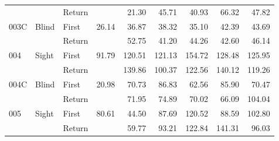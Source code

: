 \begin{table}[!htb]
\begin{tabular}{lllrrrrrr}
    &       & Return &          &   21.30 &   45.71 &                                                 40.93 &                                                  66.32 &   47.82 \\
003C & Blind & First &    26.14 &   36.87 &   38.32 &                                                 35.10 &                                                  42.39 &   43.69 \\
    &       & Return &          &   52.75 &   41.20 &                                                 44.26 &                                                  42.60 &   46.14 \\
004 & Sight & First &    91.79 &  120.51 &  121.13 &                                                154.72 &                                                 128.48 &  125.95 \\
    &       & Return &          &  139.86 &  100.37 &                                                122.56 &                                                 140.12 &  119.26 \\
004C & Blind & First &    20.98 &   70.73 &   86.83 &                                                 62.56 &                                                  85.90 &   70.47 \\
    &       & Return &          &   71.95 &   74.89 &                                                 70.02 &                                                  66.09 &  104.04 \\
005 & Sight & First &    80.61 &   44.50 &   87.69 &                                                120.52 &                                                  88.59 &  102.80 \\
    &       & Return &          &   59.77 &   93.21 &                                                122.84 &                                                 141.31 &   96.03 \\
\bottomrule
\end{tabular}
\end{table}

